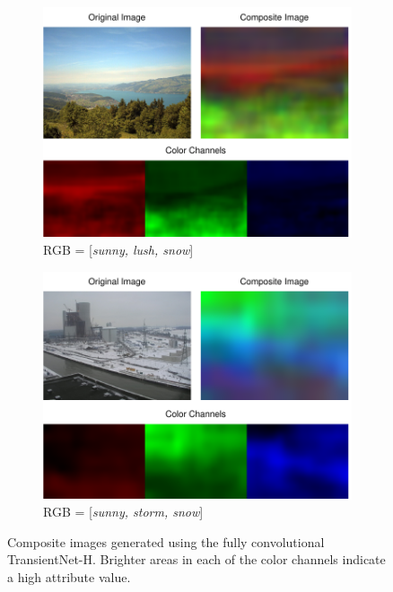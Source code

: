 \documentclass[10pt,twocolumn,letterpaper]{article}
\begin{document}
\begin{figure}
  \centering
  \begin{subfigure}[b]{0.46\textwidth}
    \centering
		\includegraphics[width=\textwidth]{figs/false_color_7371.pdf}
    \caption{RGB = [\textit{sunny, lush, snow}]}
    \label{fig:false_color_1}
  \end{subfigure}
  \hfill
  \begin{subfigure}[b]{0.46\textwidth}
    \centering
		\includegraphics[width=\textwidth]{figs/false_color_82.pdf}
    \caption{RGB = [\textit{sunny, storm, snow}]}
    \label{fig:false_color_2}
  \end{subfigure}
  \caption{Composite images generated using the fully convolutional TransientNet-H.
           Brighter areas in each of the color channels indicate a high
           attribute value.}
  \label{fig:false_color_ims}
\end{figure}
\end{document}
